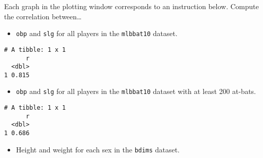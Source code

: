 \documentclass[
]{book}
\newenvironment{Shaded}{\begin{snugshade}}{\end{snugshade}}
\newcommand{\CommentTok}[1]{\textcolor[rgb]{0.56,0.35,0.01}{\textit{#1}}}
\newcommand{\DataTypeTok}[1]{\textcolor[rgb]{0.13,0.29,0.53}{#1}}
\newcommand{\DecValTok}[1]{\textcolor[rgb]{0.00,0.00,0.81}{#1}}
\newcommand{\KeywordTok}[1]{\textcolor[rgb]{0.13,0.29,0.53}{\textbf{#1}}}
\newcommand{\NormalTok}[1]{#1}
\newcommand{\OperatorTok}[1]{\textcolor[rgb]{0.81,0.36,0.00}{\textbf{#1}}}
\newcommand{\StringTok}[1]{\textcolor[rgb]{0.31,0.60,0.02}{#1}}
\providecommand{\tightlist}{%
  \setlength{\itemsep}{0pt}\setlength{\parskip}{0pt}}
\begin{document}
Each graph in the plotting window corresponds to an instruction below. Compute the correlation between\ldots{}

\begin{itemize}
\tightlist
\item
  \texttt{obp} and \texttt{slg} for all players in the \texttt{mlbbat10} dataset.
\end{itemize}

\begin{Shaded}
\end{Shaded}

\begin{verbatim}
# A tibble: 1 x 1
      r
  <dbl>
1 0.815
\end{verbatim}

\begin{itemize}
\tightlist
\item
  \texttt{obp} and \texttt{slg} for all players in the \texttt{mlbbat10} dataset with at least 200 at-bats.
\end{itemize}

\begin{Shaded}
\end{Shaded}

\begin{verbatim}
# A tibble: 1 x 1
      r
  <dbl>
1 0.686
\end{verbatim}

\begin{itemize}
\tightlist
\item
  Height and weight for each sex in the \texttt{bdims} dataset.
\end{itemize}

\begin{Shaded}
\end{Shaded}
\end{document}

